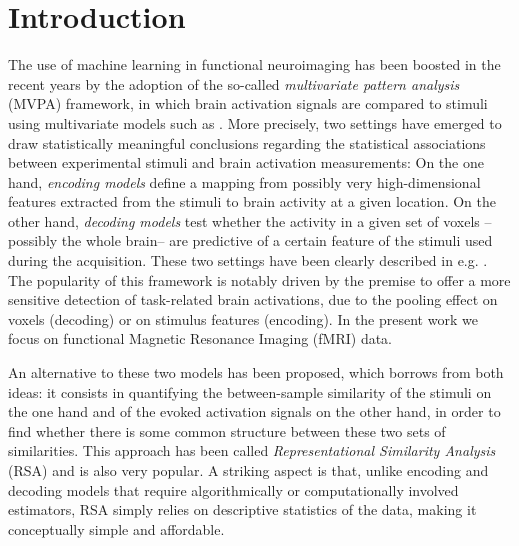 \documentclass{article}
\begin{document}
\section{Introduction}
\label{introduction}
The use of machine learning in functional neuroimaging has been
boosted in the recent years by the adoption of the so-called
\textit{multivariate pattern analysis} (MVPA) framework, in which
brain activation signals are compared to stimuli using multivariate
models such as \cite{Haxby2001,Cox2003,Haynes2006}.
%
More precisely, two settings have emerged to draw statistically
meaningful conclusions regarding the statistical associations between
experimental stimuli and brain activation measurements: 
%
On the one hand, \textit{encoding models} define a mapping from
possibly very high-dimensional features extracted from the stimuli to
brain activity at a given location.
%
On the other hand, \textit{decoding models} test whether the activity
in a given set of voxels --possibly the whole brain-- are predictive of
a certain feature of the stimuli used during the acquisition.
%
These two settings have been clearly described in
e.g. \cite{Naselaris2011,varoquaux:hal-01094737}.
%
The popularity of this framework is notably driven by the premise to
offer a more sensitive detection of task-related brain activations,
due to the pooling effect on voxels (decoding) or on stimulus features
(encoding).
%
In the present work we focus on functional Magnetic Resonance Imaging
(fMRI) data.

An alternative to these two models has been proposed, which borrows
from both ideas: it consists in quantifying the between-sample
similarity of the stimuli on the one hand and of the evoked activation
signals on the other hand, in order to find whether there is some
common structure between these two sets of similarities. 
%
%
This approach has been called \textit{Representational Similarity
  Analysis} (RSA) \cite{Kriegeskorte2008,Kriegeskorte2009} and is also
very popular.
%
A striking aspect is that, unlike
encoding and decoding models that require algorithmically or
computationally involved estimators, RSA simply relies on descriptive
statistics of the data, making it conceptually simple and affordable.
\end{document}
